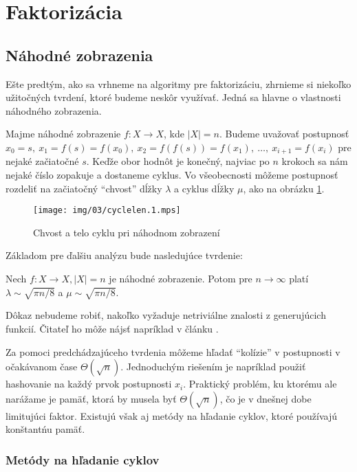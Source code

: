 \section{Faktorizácia}

\subsection{Náhodné zobrazenia}
Ešte predtým, ako sa vrhneme na algoritmy pre faktorizáciu, zhrnieme
si niekoľko užitočných tvrdení, ktoré budeme neskôr využívať. Jedná sa
hlavne o vlastnosti náhodného zobrazenia.

Majme náhodné zobrazenie $f:X \rightarrow X$, kde $|X| = n$.
Budeme uvažovať postupnosť $x_0 = s,\ x_1=f(s)=f(x_0),\ x_2 =
f(f(s))=f(x_1),\ \dots,\ x_{i+1} = f(x_{i})$ pre nejaké začiatočné $s$.
Keďže obor hodnôt je konečný, najviac po $n$ krokoch sa nám nejaké
číslo zopakuje a dostaneme cyklus. Vo všeobecnosti môžeme postupnosť
rozdeliť na začiatočný ``chvost'' dĺžky $\lambda$ a cyklus dĺžky
$\mu$, ako na obrázku \ref{fig:cyclelen}.

\begin{figure}[h!]
    \centering
    \texttt{[image: img/03/cyclelen.1.mps]}
    \caption{Chvost a telo cyklu pri náhodnom zobrazení}
    \label{fig:cyclelen}
\end{figure}

\noindent
Základom pre ďalšiu analýzu bude nasledujúce tvrdenie:

\begin{lema}
    Nech $f:X\rightarrow X, |X|=n$ je náhodné zobrazenie.
    Potom pre $n\rightarrow \infty$ platí
    $\lambda \sim \sqrt{\pi n/8}$ a 
    $\mu \sim \sqrt{\pi n/8}$.
\end{lema}
\begin{dokaz}
    Dôkaz nebudeme robiť, nakoľko vyžaduje netriviálne znalosti
    z generujúcich funkcií. Čitateľ ho môže nájsť napríklad v článku
    \cite{randommap}.
\end{dokaz}

Za pomoci predchádzajúceho tvrdenia môžeme hľadať ``kolízie'' v
postupnosti v očakávanom čase $\Theta(\sqrt{n})$.
Jednoduchým riešením je napríklad použiť hashovanie na každý prvok
postupnosti $x_i$. Praktický problém, ku ktorému ale narážame je
pamäť, ktorá by musela byť $\Theta(\sqrt{n})$, čo je v dnešnej dobe
limitujúci faktor. Existujú však aj metódy na hľadanie cyklov,
ktoré používajú konštantńu pamäť.

\subsubsection{Metódy na hľadanie cyklov}

